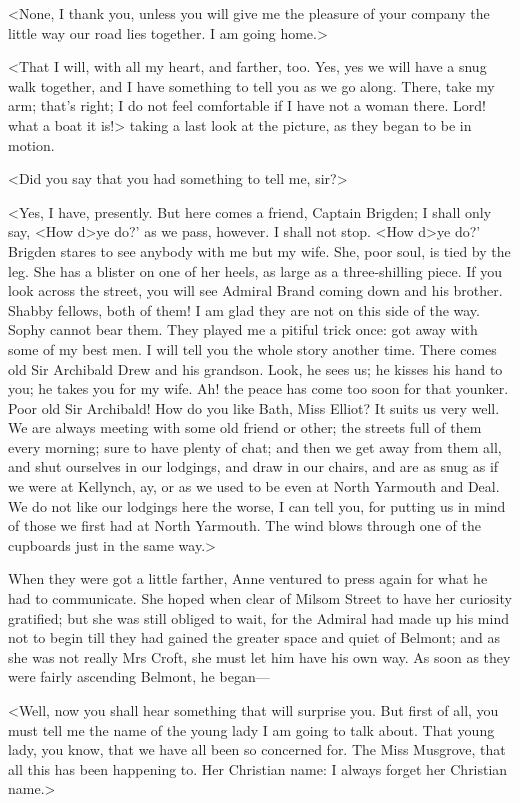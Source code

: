 <None, I thank you, unless you will give me the pleasure of your company the little way our road lies together. I am going home.>

<That I will, with all my heart, and farther, too. Yes, yes we will have a snug walk together, and I have something to tell you as we go along. There, take my arm; that's right; I do not feel comfortable if I have not a woman there. Lord! what a boat it is!> taking a last look at the picture, as they began to be in motion.

<Did you say that you had something to tell me, sir?>

<Yes, I have, presently. But here comes a friend, Captain Brigden; I shall only say, <How d>ye do?' as we pass, however. I shall not stop. <How d>ye do?' Brigden stares to see anybody with me but my wife. She, poor soul, is tied by the leg. She has a blister on one of her heels, as large as a three-shilling piece. If you look across the street, you will see Admiral Brand coming down and his brother. Shabby fellows, both of them! I am glad they are not on this side of the way. Sophy cannot bear them. They played me a pitiful trick once: got away with some of my best men. I will tell you the whole story another time. There comes old Sir Archibald Drew and his grandson. Look, he sees us; he kisses his hand to you; he takes you for my wife. Ah! the peace has come too soon for that younker. Poor old Sir Archibald! How do you like Bath, Miss Elliot? It suits us very well. We are always meeting with some old friend or other; the streets full of them every morning; sure to have plenty of chat; and then we get away from them all, and shut ourselves in our lodgings, and draw in our chairs, and are as snug as if we were at Kellynch, ay, or as we used to be even at North Yarmouth and Deal. We do not like our lodgings here the worse, I can tell you, for putting us in mind of those we first had at North Yarmouth. The wind blows through one of the cupboards just in the same way.>

When they were got a little farther, Anne ventured to press again for what he had to communicate. She hoped when clear of Milsom Street to have her curiosity gratified; but she was still obliged to wait, for the Admiral had made up his mind not to begin till they had gained the greater space and quiet of Belmont; and as she was not really Mrs Croft, she must let him have his own way. As soon as they were fairly ascending Belmont, he began—

<Well, now you shall hear something that will surprise you. But first of all, you must tell me the name of the young lady I am going to talk about. That young lady, you know, that we have all been so concerned for. The Miss Musgrove, that all this has been happening to. Her Christian name: I always forget her Christian name.>

